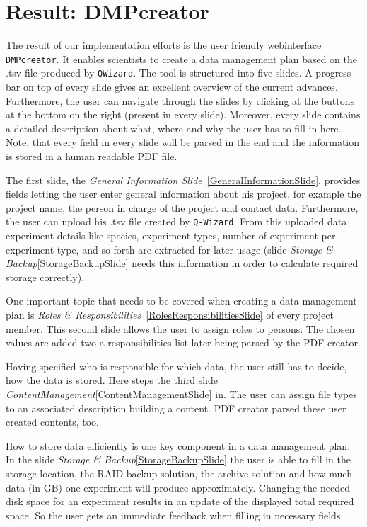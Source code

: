 
\section{Result: DMPcreator}
The result of our implementation efforts is the user friendly webinterface \texttt{DMPcreator}. It enables scientists to create a data management plan based on the .tsv file produced by \texttt{QWizard}. The tool is structured into five slides. A progress bar on top of every slide gives an excellent overview of the current advances. Furthermore, the user can navigate through the slides by clicking at the buttons at the bottom on the right (present in every slide). Moreover, every slide contains a detailed description about what, where and why the user has to fill in here. Note, that every field in every slide will be parsed in the end and the information is stored in a human readable PDF file.\par
The first slide, the \textit{General Information Slide}~\ref{GeneralInformationSlide}, provides fields letting the user enter general information about his project, for example the project name, the person in charge of the project and contact data. Furthermore, the user can upload his .tsv file created by \texttt{Q-Wizard}. From this uploaded data experiment details like species, experiment types, number of experiment per experiment type, and so forth are extracted for later usage (slide \textit{Storage \& Backup}\ref{StorageBackupSlide} needs this information in order to calculate required storage correctly). \par
One important topic that needs to be covered when creating a data management plan is \textit{Roles \& Responsibilities}~\ref{RolesResponsibilitiesSlide} of every project member. This second slide allows the user to assign roles to persons. The chosen values are added two a responsibilities list later being parsed by the PDF creator. \par Having specified who is responsible for which data, the user still has to decide, how the data is stored. Here steps the third slide \textit{ContentManagement}\ref{ContentManagementSlide} in. The user can assign file types to an associated description building a content. PDF creator parsed these user created contents, too. \par
How to store data efficiently is one key component in a data management plan. In the slide \textit{Storage \& Backup}\ref{StorageBackupSlide} the user is able to fill in the storage location, the RAID backup solution, the archive solution and how much data (in GB) one experiment will produce approximately. Changing the needed disk space for an experiment results in an update of the displayed total required space. So the user gets an immediate feedback when filling in necessary fields. \par
